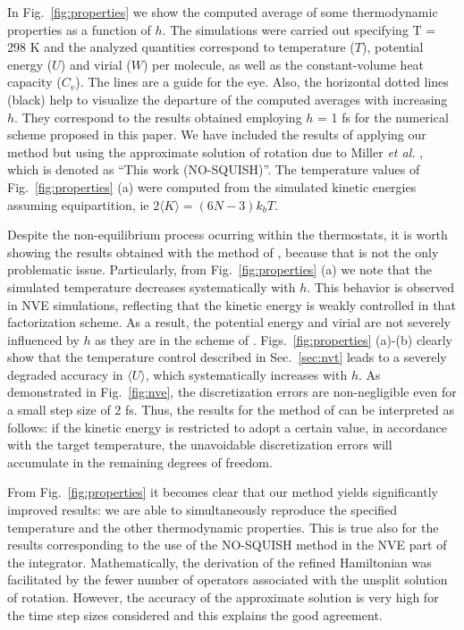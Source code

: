 \documentclass[
journal=jctcce,
layout=twocolumn
]{achemso}
\newcommand{\timestep}{h}
\begin{document}
In Fig.~\ref{fig:properties} we show the computed average of some thermodynamic properties as a function of $h$. The simulations were carried out specifying T = 298 K and the analyzed quantities correspond to temperature ($T$), potential energy ($U$) and virial ($W$) per molecule, as well as the constant-volume heat capacity ($C_v$).
The lines are a guide for the eye. 
Also, the horizontal dotted lines (black) help to visualize the departure of the computed averages with increasing $\timestep$.
They correspond to the results obtained employing $h$ = 1 fs for the numerical scheme proposed in this paper.
We have included the results of applying our method but using the approximate solution of rotation due to Miller \textit{et al.} \cite{Miller_2002}, which is denoted as ``This work (NO-SQUISH)''.
The temperature values of Fig.~\ref{fig:properties} (a) were computed from the simulated kinetic energies assuming equipartition, ie $2 \langle K \rangle = (6N -3) k_b T$.

Despite the non-equilibrium process ocurring within the thermostats, it is worth showing the results obtained with the method of \citeauthor{Kamberaj_2005} \cite{Kamberaj_2005}, because that is not the only problematic issue.
Particularly, from Fig.~\ref{fig:properties} (a) we note that the simulated temperature decreases systematically with $\timestep$.
This behavior is observed in NVE simulations\cite{Davidchack_2009,Silveira_2017}, reflecting that the kinetic energy is weakly controlled in that factorization scheme.
As a result, the potential energy and virial are not severely influenced by $\timestep$ as they are in the scheme of \citeauthor{Martyna_1996} \cite{Martyna_1996}. Figs.~\ref{fig:properties} (a)-(b) clearly show that the temperature control described in Sec.~\ref{sec:nvt} leads to a severely degraded accuracy in $\langle U \rangle$, which systematically increases with $\timestep$.
As demonstrated in Fig.~\ref{fig:nve}, the discretization errors are non-negligible even for a small step size of 2 fs.
Thus, the results for the method of \citeauthor{Martyna_1996} \cite{Martyna_1996} can be interpreted as follows: if the kinetic energy is restricted to adopt a certain value, in accordance with the target temperature, the unavoidable discretization errors will accumulate in the remaining degrees of freedom.

From Fig.~\ref{fig:properties} it becomes clear that our method yields significantly improved results: we are able to simultaneously reproduce the specified temperature and the other thermodynamic properties. 
This is true also for the results corresponding to the use of the NO-SQUISH method\cite{Miller_2002} in the NVE part of the integrator.
Mathematically, the derivation of the refined Hamiltonian was facilitated by the fewer number of operators associated with the unsplit solution of rotation.
However, the accuracy of the approximate solution is very high for the time step sizes considered\cite{Silveira_2017} and this explains the good agreement.
\end{document}

